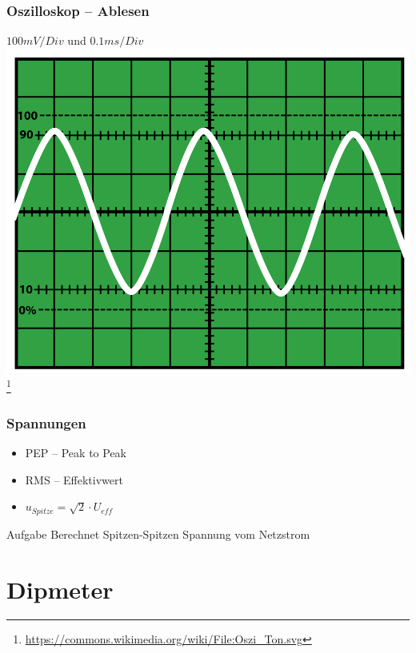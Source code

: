 \begin{frame}
    \frametitle{Oszilloskop -- Ablesen}
    \begin{center}
        $100mV / Div$ und $0.1ms / Div$\\
        \includegraphics[width=.8\textwidth,height=.7\textheight,keepaspectratio]{e17/OsziTon.png}
        \footnote{\tiny \url{https://commons.wikimedia.org/wiki/File:Oszi_Ton.svg}}
	\end{center}
\end{frame}

\begin{frame}
    \frametitle{Spannungen}
    \begin{center}
    \begin{itemize}
			\item PEP -- Peak to Peak
			\item RMS -- Effektivwert
			\item $u_{Spitze} = \sqrt{2} \cdot U_{eff}$ \\
    \end{itemize}
  \end{center}
  \begin{exampleblock}{Aufgabe}
    Berechnet Spitzen-Spitzen Spannung vom Netzstrom
  \end{exampleblock}
\end{frame}

\section*{Dipmeter}

